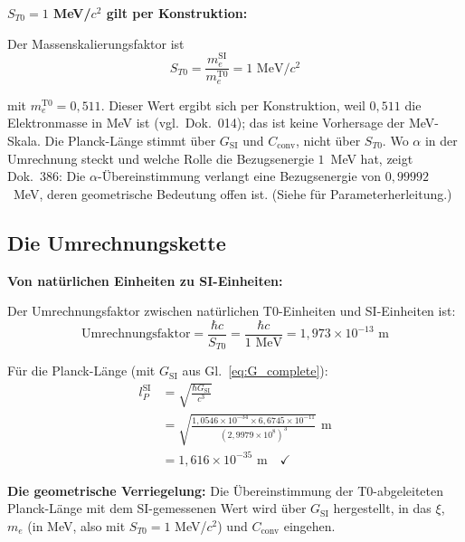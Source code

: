 	\begin{keyresult}
		\textbf{$S_{T0} = 1$ MeV/$c^2$ gilt per Konstruktion:}
		
		Der Massenskalierungsfaktor ist
		\begin{equation}
			\boxed{S_{T0} = \frac{m_e^{\text{SI}}}{m_e^{\text{T0}}} = 1 \text{ MeV}/c^2}
		\end{equation}
		
		mit $m_e^{\text{T0}} = 0{,}511$. Dieser Wert ergibt sich per Konstruktion, weil $0{,}511$ die Elektronmasse in MeV ist (vgl.\ Dok.~014); das ist keine Vorhersage der MeV-Skala. Die Planck-Länge stimmt über $G_{\text{SI}}$ und $C_{\text{conv}}$, nicht über $S_{T0}$. Wo $\alpha$ in der Umrechnung steckt und welche Rolle die Bezugsenergie $1$~MeV hat, zeigt Dok.~386: Die $\alpha$-Übereinstimmung verlangt eine Bezugsenergie von $0{,}99992$~MeV, deren geometrische Bedeutung offen ist. (Siehe \cite{parameterherleitung_De} für Parameterherleitung.)
	\end{keyresult}
	
	\subsection{Die Umrechnungskette}
	
	\begin{derivation}
		\textbf{Von natürlichen Einheiten zu SI-Einheiten:}
		
		Der Umrechnungsfaktor zwischen natürlichen T0-Einheiten und SI-Einheiten ist:
		\begin{equation}
			\text{Umrechnungsfaktor} = \frac{\hbar c}{S_{T0}} = \frac{\hbar c}{1 \text{ MeV}} = 1{,}973 \times 10^{-13} \text{ m}
		\end{equation}
		
		Für die Planck-Länge (mit $G_{\text{SI}}$ aus Gl.~\eqref{eq:G_complete}):
		\begin{align}
			l_P^{\text{SI}} &= \sqrt{\frac{\hbar G_{\text{SI}}}{c^3}} \\
			&= \sqrt{\frac{1{,}0546 \times 10^{-34} \times 6{,}6745 \times 10^{-11}}{(2{,}9979 \times 10^{8})^3}} \text{ m} \\
			&= 1{,}616 \times 10^{-35} \text{ m} \quad \checkmark
		\end{align}
		
		\textbf{Die geometrische Verriegelung:} Die Übereinstimmung der T0-abgeleiteten Planck-Länge mit dem SI-gemessenen Wert wird über $G_{\text{SI}}$ hergestellt, in das $\xi$, $m_e$ (in MeV, also mit $S_{T0} = 1$ MeV/$c^2$) und $C_{\text{conv}}$ eingehen.
	\end{derivation}
	

